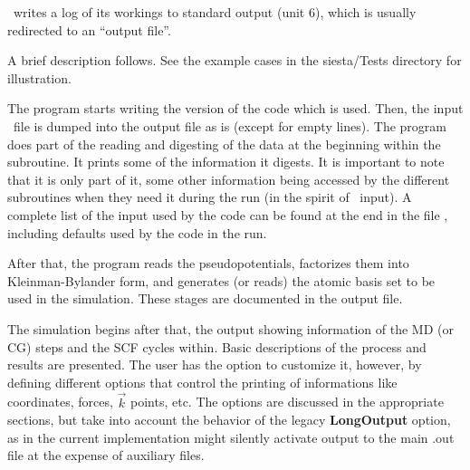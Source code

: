 \siesta\ writes a log of its workings to standard output (unit 6),
which is usually redirected to an ``output file''.

A brief description follows. See the example cases in the
siesta/Tests directory for illustration.

The program starts writing the version of the code which is
used. Then, the input \fdflib\ file is dumped into the output file as is
(except for empty lines). The program does part of the reading and
digesting of the data at the beginning within the 
subroutine. It prints some of the information it digests. It is
important to note that it is only part of it, some other information
being accessed by the different subroutines when they need it during
the run (in the spirit of \fdflib\ input).  A complete list of the input
used by the code can be found at the end in the file ,
including defaults used by the code in the run.

After that, the program reads the pseudopotentials, factorizes them
into Kleinman-Bylander form, and generates (or reads) the atomic basis
set to be used in the simulation. These stages are documented in the
output file.

The simulation begins after that, the output showing information of
the MD (or CG) steps and the SCF cycles within.  Basic descriptions of
the process and results are presented. The user has the option to
customize it, however, by defining
different options that control the printing of informations like
coordinates, forces, $\vec k$ points, etc.  The options are discussed
in the appropriate sections, but take into account the behavior of the
legacy \textbf{LongOutput} option, as in the current implementation might
silently activate output to the main .out file at the expense of
auxiliary files.

